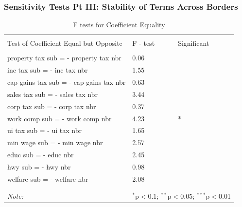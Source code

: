 \documentclass{beamer}
\begin{document}
\begin{frame}
\frametitle{Sensitivity Tests Pt III: Stability of Terms Across Borders}

\begin{table}[h]
\centering
\caption{F tests for Coefficient Equality}
\label{table:Ftests}
\begin{tabular}{lll}
\hline \\[-1.8ex] 
Test of Coefficient Equal but Opposite  & F - test   & Significant \\
\hline \\[-1.8ex] 
property tax  sub = - property tax nbr  & 0.06 &             \\
inc tax sub = - inc tax nbr             & 1.55 &             \\
cap gains tax sub = - cap gains tax nbr & 0.63 &             \\
sales tax sub = - sales tax nbr         & 3.44 &             \\
corp tax sub = - corp tax nbr           & 0.37 &             \\
work comp sub = - work comp nbr         & 4.23 & *           \\
ui tax sub = - ui tax nbr               & 1.65 &             \\
min wage sub = - min wage nbr           & 2.57 &             \\
educ sub = - educ nbr                   & 2.45 &             \\
hwy sub = - hwy nbr                     & 0.98 &             \\
welfare sub = - welfare nbr             & 2.08 &            \\
\hline \\[-1.8ex] 
\hline 
\hline \\[-1.8ex] 
\textit{Note:}  & \multicolumn{2}{r}{$^{*}$p$<$0.1; $^{**}$p$<$0.05; $^{***}$p$<$0.01} \\ 
\end{tabular}
\end{table}

\end{frame}
\end{document}

